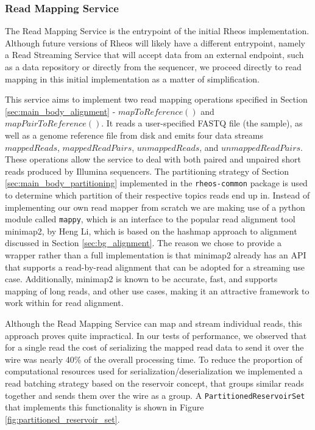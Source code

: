 \subsubsection{Read Mapping Service}

The Read Mapping Service is the entrypoint of the initial Rheos implementation. Although future versions of Rheos will likely have a different entrypoint, namely a Read Streaming Service that will accept data from an external endpoint, such as a data repository or directly from the sequencer, we proceed directly to read mapping in this initial implementation as a matter of simplification. 

This service aims to implement two read mapping operations specified in Section \ref{sec:main_body_alignment} - $mapToReference()$ and $mapPairToReference()$. It reads a user-specified FASTQ file (the sample), as well as a genome reference file from disk and emits four data streams $mappedReads$, $mappedReadPairs$, $unmappedReads$, and $unmappedReadPairs$. These operations allow the service to deal with both paired and unpaired short reads produced by Illumina sequencers. The partitioning strategy of Section \ref{sec:main_body_partitioning} implemented in the \texttt{rheos-common} package is used to determine which partition of their respective topics reads end up in. Instead of implementing our own read mapper from scratch we are making use of a python module called \texttt{mappy}, which is an interface to the popular read alignment tool minimap2\autocite{li2018minimap2}, by Heng Li, which is based on the hashmap approach to alignment discussed in Section \ref{sec:bg_alignment}. The reason we chose to provide a wrapper rather than a full implementation is that minimap2 already has an API that supports a read-by-read alignment that can be adopted for a streaming use case. Additionally, minimap2 is known to be accurate, fast, and supports mapping of long reads, and other use cases, making it an attractive framework to work within for read alignment.

Although the Read Mapping Service can map and stream individual reads, this approach proves quite impractical. In our tests of performance, we observed that for a single read the cost of serializing the mapped read data to send it over the wire was nearly 40\% of the overall processing time. To reduce the proportion of computational resources used for serialization/deserialization we implemented a read batching strategy based on the reservoir concept, that groups similar reads together and sends them over the wire as a group. A \texttt{PartitionedReservoirSet} that implements this functionality is shown in Figure \ref{fig:partitioned_reservoir_set}.

